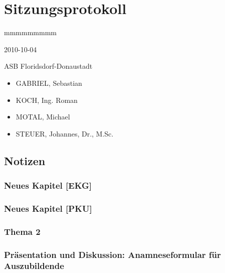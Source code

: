 \documentclass[
ngerman,
paper=a4,
fontsize=8pt,
headings=small,
draft=no,
parskip=half,
noonelinecaption
]{scrreprt}
\begin{document}
\section{Sitzungsprotokoll}

\begin{labeling}[:]{mmmmmmmmm}
  \item[Datum] 2010-10-04
  \item[Ort] ASB Floridsdorf-Donaustadt
  \item[Teilnehmer] \begin{itemize}
  \item GABRIEL, Sebastian
  \item KOCH, Ing. Roman
  \item MOTAL, Michael
  \item STEUER, Johannes, Dr., M.Sc.
\end{itemize}
\end{labeling}

% 

\subsection{Notizen}

\subsubsection{Neues Kapitel [EKG]}

\subsubsection{Neues Kapitel [PKU]}

\subsubsection{Thema 2}

\subsubsection{Präsentation und Diskussion: Anamneseformular
für Auszubildende}
\end{document}
